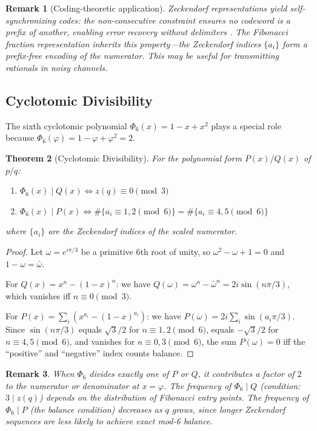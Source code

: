 \documentclass[11pt]{article}
\newtheorem{theorem}{Theorem}
\newtheorem{remark}[theorem]{Remark}
\begin{document}
\begin{remark}[Coding-theoretic application]
Zeckendorf representations yield \emph{self-synchronizing codes}: the non-consecutive constraint ensures no codeword is a prefix of another, enabling error recovery without delimiters \cite{apostolico1987}. The Fibonacci fraction representation inherits this property---the Zeckendorf indices $\{a_i\}$ form a prefix-free encoding of the numerator. This may be useful for transmitting rationals in noisy channels.
\end{remark}

\subsection{Cyclotomic Divisibility}

The sixth cyclotomic polynomial $\Phi_6(x) = 1 - x + x^2$ plays a special role because $\Phi_6(\varphi) = 1 - \varphi + \varphi^2 = 2$.

\begin{theorem}[Cyclotomic Divisibility]
For the polynomial form $P(x)/Q(x)$ of $p/q$:
\begin{enumerate}
\item $\Phi_6(x) \mid Q(x) \iff z(q) \equiv 0 \pmod{3}$
\item $\Phi_6(x) \mid P(x) \iff \#\{a_i \equiv 1,2 \pmod{6}\} = \#\{a_i \equiv 4,5 \pmod{6}\}$
\end{enumerate}
where $\{a_i\}$ are the Zeckendorf indices of the scaled numerator.
\end{theorem}

\begin{proof}
Let $\omega = e^{i\pi/3}$ be a primitive 6th root of unity, so $\omega^2 - \omega + 1 = 0$ and $1 - \omega = \bar{\omega}$.

For $Q(x) = x^n - (1-x)^n$: we have $Q(\omega) = \omega^n - \bar{\omega}^n = 2i\sin(n\pi/3)$, which vanishes iff $n \equiv 0 \pmod{3}$.

For $P(x) = \sum_i (x^{a_i} - (1-x)^{a_i})$: we have $P(\omega) = 2i\sum_i \sin(a_i\pi/3)$. Since $\sin(n\pi/3)$ equals $\sqrt{3}/2$ for $n \equiv 1,2 \pmod{6}$, equals $-\sqrt{3}/2$ for $n \equiv 4,5 \pmod{6}$, and vanishes for $n \equiv 0,3 \pmod{6}$, the sum $P(\omega) = 0$ iff the ``positive'' and ``negative'' index counts balance.
\end{proof}

\begin{remark}
When $\Phi_6$ divides exactly one of $P$ or $Q$, it contributes a factor of $2$ to the numerator or denominator at $x = \varphi$. The frequency of $\Phi_6 \mid Q$ (condition: $3 \mid z(q)$) depends on the distribution of Fibonacci entry points. The frequency of $\Phi_6 \mid P$ (the balance condition) decreases as $q$ grows, since longer Zeckendorf sequences are less likely to achieve exact mod-6 balance.
\end{remark}
\end{document}
